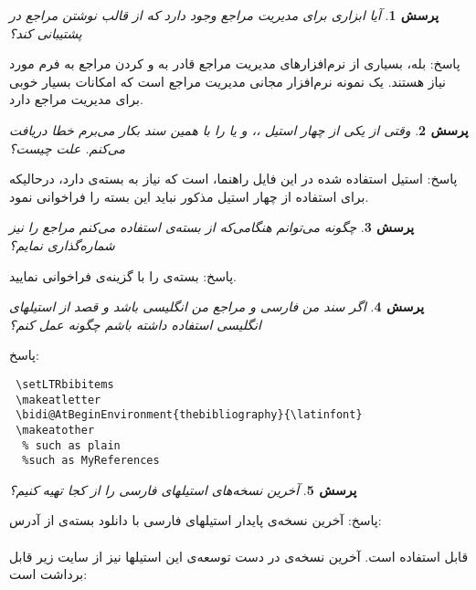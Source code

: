 \documentclass[a4paper]{article}
\theoremstyle{plain}\newtheorem{question}{پرسش}
\newcommand{\answer}{{\noindent \Sayeh پاسخ: }}
\begin{document}
\begin{question} آیا ابزاری برای مدیریت مراجع وجود دارد که از قالب نوشتن مراجع در  پشتیبانی کند؟ \end{question}
\answer بله، بسیاری از نرم‌افزارهای مدیریت مراجع قادر به  و  کردن مراجع به فرم مورد نیاز  هستند. یک نمونه نرم‌افزار مجانی مدیریت مراجع  است که امکانات بسیار خوبی برای مدیریت مراجع دارد.

\begin{question} وقتی از یکی از چهار استیل ،،  و یا  را با همین سند بکار می‌برم خطا دریافت می‌کنم. علت چیست؟
 \end{question}
\answer استیل استفاده شده در این فایل راهنما،  است که نیاز به بسته‌ی  دارد، درحالیکه برای استفاده از چهار استیل مذکور نباید این بسته را فراخوانی نمود.

\begin{question} چگونه می‌توانم هنگامی‌که از بسته‌ی  استفاده می‌کنم مراجع را نیز شماره‌گذاری نمایم؟
 \end{question}
\answer بسته‌ی  را با گزینه‌ی  فراخوانی نمایید.



\begin{question}اگر سند من فارسی و مراجع من انگلیسی باشد و قصد از استیلهای انگلیسی استفاده داشته باشم چگونه عمل کنم؟
 \end{question}
\answer
\begin{LTR}
\begin{verbatim}
 \setLTRbibitems
 \makeatletter
 \bidi@AtBeginEnvironment{thebibliography}{\latinfont}
 \makeatother
  % such as plain
  %such as MyReferences
\end{verbatim}
\end{LTR}
 
\begin{question} آخرین نسخه‌های استیلهای فارسی را از کجا تهیه کنیم؟
 \end{question}
\answer آخرین نسخه‌ی پایدار استیلهای فارسی با دانلود بسته‌ی  از آدرس:\\
\\
  قابل استفاده است. آخرین نسخه‌ی در دست توسعه‌ی این استیلها نیز از سایت زیر قابل برداشت است:\\ 
\end{document}
